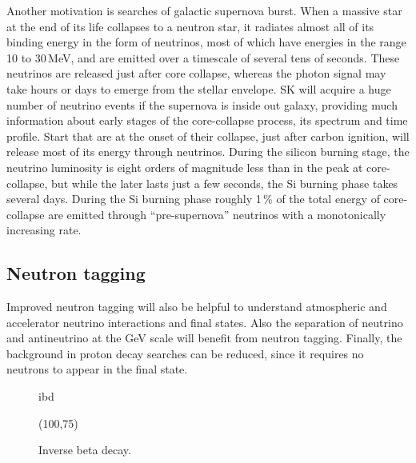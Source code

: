 Another motivation is searches of galactic supernova burst.
When a massive star at the end of its life collapses to a neutron star, %
it radiates almost all of its binding energy in the form of neutrinos, %
most of which have energies in the range 10 to 30\,MeV, and are emitted over a timescale of several tens of seconds.
These neutrinos are released just after core collapse, whereas the photon signal may take hours %
or days to emerge from the stellar envelope.
SK will acquire a huge number of neutrino events if the supernova is inside out galaxy, %
providing much information about early stages of the core-collapse process, %
its spectrum and time profile.
Start that are at the onset of their collapse, just after carbon ignition, will release most of its energy through neutrinos.
During the silicon burning stage, the neutrino luminosity is eight orders of magnitude less than %
in the peak at core-collapse, but while the later lasts just a few seconds, %
the Si burning phase takes several days.
During the Si burning phase roughly 1\,\% of the total energy of core-collapse are emitted through
``pre-supernova'' neutrinos with a monotonically increasing rate.

\subsection{Neutron tagging}

Improved neutron tagging will also be helpful to understand atmospheric and accelerator neutrino interactions and final states.
Also the separation of neutrino and antineutrino at the GeV scale will benefit from neutron tagging.
Finally, the background in proton decay searches can be reduced, since it requires no neutrons to appear in the final state.

\begin{figure}
	\centering
	\begin{fmffile}{ibd}
		\begin{fmfgraph*}(100,75)
			\fmffreeze
			\begin{fmfgroup}
			\end{fmfgroup}
		\end{fmfgraph*}
	\end{fmffile}
	\smallskip
	\caption{Inverse beta decay.}
\end{figure}

